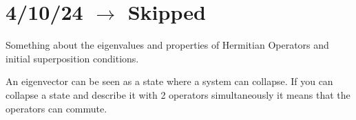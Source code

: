 \section{4/10/24 $\rightarrow$ Skipped}

Something about the eigenvalues and properties of Hermitian Operators and initial superposition conditions.

\vspace{10pt}

An eigenvector can be seen as a state where a system can collapse. If you can collapse a state and describe it with 2 operators simultaneously it means that the operators can commute.